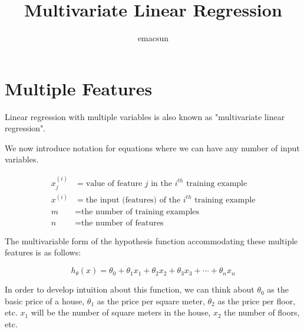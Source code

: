 \documentclass[10pt,a4paper,UTF8]{article}
\author{emacsun}
\date{}
\title{Multivariate Linear Regression}
\begin{document}
\maketitle
\tableofcontents
{}
\section{Multiple Features}
\label{sec:org525a819}


Linear regression with multiple variables is also known as "multivariate linear regression".

We now introduce notation for equations where we can have any number of input variables.

\begin{align*}x_j^{(i)} &= \text{value of feature } j \text{ in the }i^{th}\text{ training example} \\ x^{(i)}& = \text{the input (features) of the }i^{th}\text{ training example} \\ m &= \text{the number of training examples} \\ n &= \text{the number of features} \end{align*}

The multivariable form of the hypothesis function accommodating these multiple features is as follows:

\begin{equation}
\label{eq:1}
h_\theta (x) = \theta_0 + \theta_1 x_1 + \theta_2 x_2 + \theta_3 x_3 + \cdots + \theta_n x_n
\end{equation}

In order to develop intuition about this function, we can think about \(\theta_{0}\) as the basic price of a house, \(\theta_{1}\) as the price per square meter, \(\theta_{2}\) as the price per floor, etc. \(x_{1}\) will be the number of square meters in the house, \(x_{2}\) the number of floors, etc.
\end{document}
